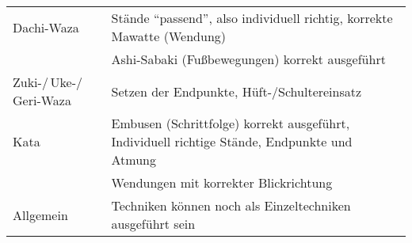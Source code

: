	\null\vfill\null
	{\small\begin{tabularx}{\textwidth}{ll}
		Dachi-Waza					& Stände \textquotedblleft passend\textquotedblright , also individuell richtig, korrekte Mawatte (Wendung) \\
		& Ashi-Sabaki (Fußbewegungen) korrekt ausgeführt \\
		Zuki-/\,Uke-/\,Geri-Waza	& Setzen der Endpunkte, Hüft-/Schultereinsatz \\
		Kata						& Embusen (Schrittfolge) korrekt ausgeführt, Individuell richtige Stände, Endpunkte und Atmung \\
		& Wendungen mit korrekter Blickrichtung \\
		Allgemein					& Techniken können noch als Einzeltechniken ausgeführt sein \\
	\end{tabularx}}\null\vfill\null